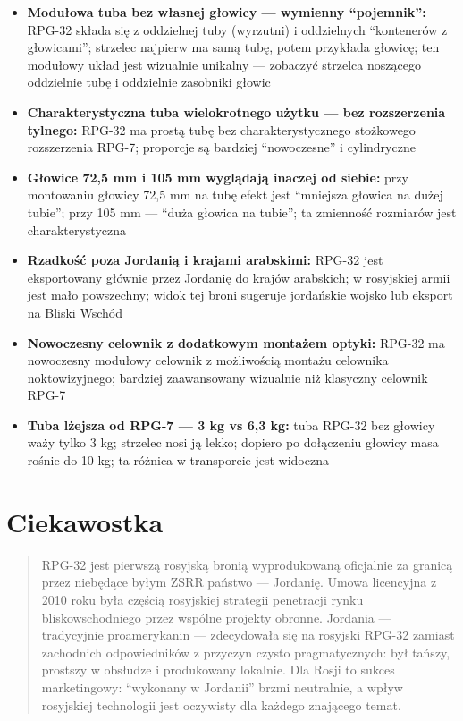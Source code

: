 \documentclass[12pt,openany,oneside]{book}
\providecommand{\tightlist}{%
  \setlength{\itemsep}{0pt}\setlength{\parskip}{0pt}}
\begin{document}
\begin{itemize}
\tightlist
\item
  \textbf{Modułowa tuba bez własnej głowicy --- wymienny ``pojemnik'':}
  RPG-32 składa się z oddzielnej tuby (wyrzutni) i oddzielnych
  ``kontenerów z głowicami''; strzelec najpierw ma samą tubę, potem
  przykłada głowicę; ten modułowy układ jest wizualnie unikalny ---
  zobaczyć strzelca noszącego oddzielnie tubę i oddzielnie zasobniki
  głowic
\item
  \textbf{Charakterystyczna tuba wielokrotnego użytku --- bez
  rozszerzenia tylnego:} RPG-32 ma prostą tubę bez charakterystycznego
  stożkowego rozszerzenia RPG-7; proporcje są bardziej ``nowoczesne'' i
  cylindryczne
\item
  \textbf{Głowice 72,5 mm i 105 mm wyglądają inaczej od siebie:} przy
  montowaniu głowicy 72,5 mm na tubę efekt jest ``mniejsza głowica na
  dużej tubie''; przy 105 mm --- ``duża głowica na tubie''; ta zmienność
  rozmiarów jest charakterystyczna
\item
  \textbf{Rzadkość poza Jordanią i krajami arabskimi:} RPG-32 jest
  eksportowany głównie przez Jordanię do krajów arabskich; w rosyjskiej
  armii jest mało powszechny; widok tej broni sugeruje jordańskie wojsko
  lub eksport na Bliski Wschód
\item
  \textbf{Nowoczesny celownik z dodatkowym montażem optyki:} RPG-32 ma
  nowoczesny modułowy celownik z możliwością montażu celownika
  noktowizyjnego; bardziej zaawansowany wizualnie niż klasyczny celownik
  RPG-7
\item
  \textbf{Tuba lżejsza od RPG-7 --- 3 kg vs 6,3 kg:} tuba RPG-32 bez
  głowicy waży tylko 3 kg; strzelec nosi ją lekko; dopiero po dołączeniu
  głowicy masa rośnie do 10 kg; ta różnica w transporcie jest widoczna
\end{itemize}

\section{Ciekawostka}\label{ciekawostka-75}

\begin{quote}
RPG-32 jest pierwszą rosyjską bronią wyprodukowaną oficjalnie za granicą
przez niebędące byłym ZSRR państwo --- Jordanię. Umowa licencyjna z 2010
roku była częścią rosyjskiej strategii penetracji rynku
bliskowschodniego przez wspólne projekty obronne. Jordania ---
tradycyjnie proamerykanin --- zdecydowała się na rosyjski RPG-32 zamiast
zachodnich odpowiedników z przyczyn czysto pragmatycznych: był tańszy,
prostszy w obsłudze i produkowany lokalnie. Dla Rosji to sukces
marketingowy: ``wykonany w Jordanii'' brzmi neutralnie, a wpływ
rosyjskiej technologii jest oczywisty dla każdego znającego temat.
\end{quote}
\end{document}
